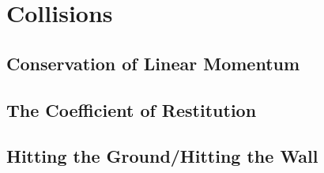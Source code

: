 \documentclass[../alevelmaths.tex]{subfiles}
\begin{document}
\chapter{Collisions}
\section{Conservation of Linear Momentum}
\section{The Coefficient of Restitution}
\section{Hitting the Ground/Hitting the Wall}
\end{document}
